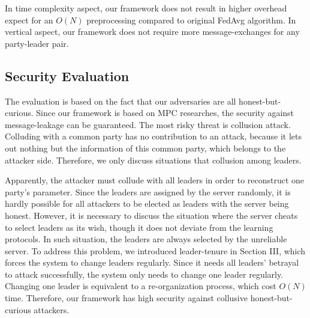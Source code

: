 In time complexity aspect, our framework does not result in higher overhead expect for an $O(N)$ preprocessing compared to original FedAvg algorithm. In vertical aspect, our framework does not require more message-exchanges for any party-leader pair. 

\subsection{Security Evaluation}
The evaluation is based on the fact that our adversaries are all honest-but-curious. Since our framework is based on MPC researches\cite{Shamir,Du2001SecureMC,Three-Party}, the security against message-leakage can be guaranteed. The most risky threat is collusion attack. Colluding with a common party has no contribution to an attack, because it lets out nothing but the information of this common party, which belongs to the attacker side. Therefore, we only discuss situations that collusion among leaders. 

Apparently, the attacker must collude with all leaders in order to reconstruct one party's parameter. Since the leaders are assigned by the server randomly, it is hardly possible for all attackers to be elected as leaders with the server being honest. However, it is necessary to discuss the situation where the server cheats to select leaders as its wish, though it does not deviate from the learning protocols. In such situation, the leaders are always selected by the unreliable server. To address this problem, we introduced leader-tenure in Section III, which forces the system to change leaders regularly. Since it needs all leaders' betrayal to attack successfully, the system only needs to change one leader regularly. Changing one leader is equivalent to a re-organization process, which cost $O(N)$ time. Therefore, our framework has high security against collusive honest-but-curious attackers.
